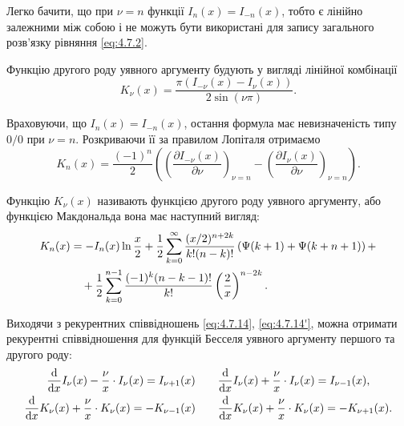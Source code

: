 Легко бачити, що при $\nu = n$ функції $I_n(x) = I_{-n}(x)$, тобто є лінійно залежними між собою і не можуть бути використані для запису загального розв'язку рівняння \eqref{eq:4.7.2}. \medskip

Функцію другого роду уявного аргументу будують у вигляді лінійної комбінації
\begin{equation}
	\label{eq:4.7.19}
	K_\nu(x) = \frac{\pi (I_{-\nu}(x) - I_\nu(x))}{2 \sin (\nu \pi)}.
\end{equation}

Враховуючи, що $I_n(x) = I_{-n}(x)$, остання формула має невизначеність типу $0/0$ при $\nu = n$. Розкриваючи її за правилом Лопіталя отримаємо 
\begin{equation}
	\label{eq:4.7.20}
	K_n(x) = \frac{(-1)^n}{2} \left( \left( \frac{\partial I_{-\nu}(x)}{\partial \nu} \right)_{\nu = n} - \left( \frac{\partial I_\nu(x)}{\partial \nu} \right)_{\nu = n} \right).
\end{equation}

\begin{definition}
	Функцію $K_\nu(x)$ називають функцією другого роду уявного аргументу, або функцією Макдональда вона має наступний вигляд:
	\begin{equation}
		\label{eq:4.7.21}
		\begin{aligned}
			K_n(x) &= -I_n(x) \ln \frac{x}{2} + \frac{1}{2} \displaystyle\sum\limits_{k = 0}^\infty \frac{(x/2)^{n + 2 k}}{k! (n - k)!} \left( \Psi(k + 1) + \Psi(k + n + 1) \right) + \\
			& \quad + \frac{1}{2} \displaystyle\sum\limits_{k=0}^{n-1} \frac{(-1)^k (n - k - 1)!}{k!} \left(\frac{2}{x}\right)^{n-2k}.
		\end{aligned}
	\end{equation}
\end{definition}

Виходячи з рекурентних співвідношень \eqref{eq:4.7.14}, \eqref{eq:4.7.14'}, можна отримати рекурентні співвідношення для функцій Бесселя уявного аргументу першого та другого роду:
\begin{gather}
	\label{eq:4.7.22}
	\frac{\diff}{\diff x} I_\nu(x) - \frac{\nu}{x} \cdot I_\nu(x) = I_{\nu+1}(x) \qquad \frac{\diff}{\diff x} I_\nu(x) + \frac{\nu}{x} \cdot I_\nu(x) = I_{\nu-1}(x), \\
	\label{eq:4.7.23}
	\frac{\diff}{\diff x} K_\nu(x) + \frac{\nu}{x} \cdot K_\nu(x) = -K_{\nu-1}(x) \qquad \frac{\diff}{\diff x} K_\nu(x) + \frac{\nu}{x} \cdot K_\nu(x) = -K_{\nu+1}(x).
\end{gather}

